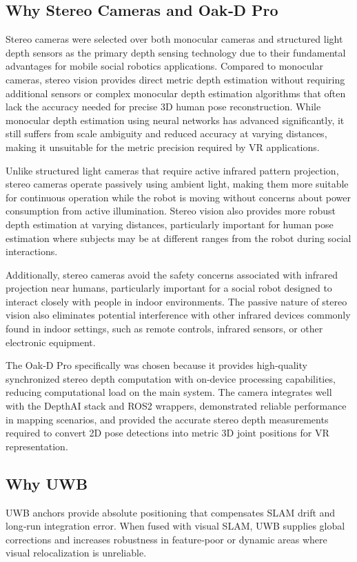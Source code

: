 \subsection*{Why Stereo Cameras and Oak‑D Pro}
Stereo cameras were selected over both monocular cameras and structured light depth sensors as the primary depth sensing technology due to their fundamental advantages for mobile social robotics applications. Compared to monocular cameras, stereo vision provides direct metric depth estimation without requiring additional sensors or complex monocular depth estimation algorithms that often lack the accuracy needed for precise 3D human pose reconstruction. While monocular depth estimation using neural networks has advanced significantly, it still suffers from scale ambiguity and reduced accuracy at varying distances, making it unsuitable for the metric precision required by VR applications.

Unlike structured light cameras that require active infrared pattern projection, stereo cameras operate passively using ambient light, making them more suitable for continuous operation while the robot is moving without concerns about power consumption from active illumination. Stereo vision also provides more robust depth estimation at varying distances, particularly important for human pose estimation where subjects may be at different ranges from the robot during social interactions.

Additionally, stereo cameras avoid the safety concerns associated with infrared projection near humans, particularly important for a social robot designed to interact closely with people in indoor environments. The passive nature of stereo vision also eliminates potential interference with other infrared devices commonly found in indoor settings, such as remote controls, infrared sensors, or other electronic equipment.

The Oak‑D Pro specifically was chosen because it provides high-quality synchronized stereo depth computation with on‑device processing capabilities, reducing computational load on the main system. The camera integrates well with the DepthAI stack and ROS2 wrappers, demonstrated reliable performance in mapping scenarios, and provided the accurate stereo depth measurements required to convert 2D pose detections into metric 3D joint positions for VR representation.

\subsection*{Why UWB}
UWB anchors provide absolute positioning that compensates SLAM drift and long‑run integration error. When fused with visual SLAM, UWB supplies global corrections and increases robustness in feature‑poor or dynamic areas where visual relocalization is unreliable.

